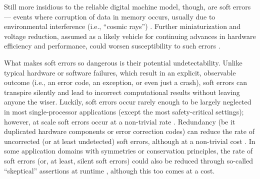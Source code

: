 Still more insidious to the reliable digital machine model, though, are soft errors --- events where corruption of data in memory occurs, usually due to environmental interference (i.e., ``cosmic rays'') \citep{karnik2004characterization}.
Further miniaturization and voltage reduction, assumed as a likely vehicle for continuing advances in hardware efficiency and performance, could worsen susceptibility to such errors \citep{dongarra2014applied,kajmakovic2020challenges}.

What makes soft errors so dangerous is their potential undetectability.
Unlike typical hardware or software failures, which result in an explicit, observable outcome (i.e., an error code, an exception, or even just a crash), soft errors can transpire silently and lead to incorrect computational results without leaving anyone the wiser.
Luckily, soft errors occur rarely enough to be largely neglected in most single-processor applications (except the most safety-critical settings); however, at scale soft errors occur at a non-trivial rate \citep{sridharan2015memory,scoles2018cosmic}.
Redundancy (be it duplicated hardware components or error correction codes) can reduce the rate of uncorrected (or at least undetected) soft errors, although at a non-trivial cost \citep{vankeirsbilck2015soft,sridharan2015memory}.
In some application domains with symmetries or conservation principles, the rate of soft errors (or, at least, silent soft errors) could also be reduced through so-called ``skeptical'' assertions at runtime \citep{dongarra2014applied}, although this too comes at a cost.

